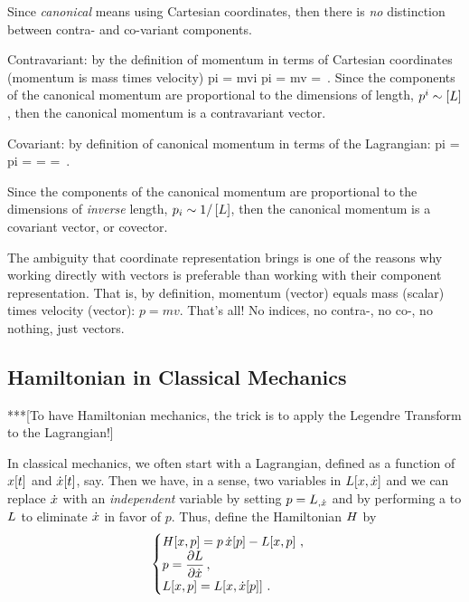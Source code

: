 \begin{solution}
Since \emph{canonical} means using Cartesian coordinates, then there is \emph{no} distinction between contra- and co-variant components.

Contravariant: by the definition of momentum in terms of Cartesian coordinates (momentum is mass times velocity)
\beq
\cnvec pi = m\cnvec vi \implies \dim \cnvec pi = \dim mv = \,.
\eeq
Since the components of the canonical momentum are proportional to the dimensions of length, ${p}^{i}\sim \left[{L}\right]$, then the canonical momentum is a contravariant vector.

Covariant: by definition of canonical momentum in terms of the Lagrangian:
\beq
\covec pi = \xpd{}\implies \dim\covec pi 
          = \dim \xpd{} 
          = 
          = \,.
\eeq

Since the components of the canonical momentum are proportional to the dimensions of \emph{inverse} length, ${p}_{i}\sim 1/\left[{L}\right]$, then the canonical momentum is a covariant vector, or covector.
\end{solution}

\begin{note}
The ambiguity that coordinate representation brings is one of the reasons why working directly with vectors is preferable than working with their component representation. That is, by definition, momentum (vector) equals mass (scalar) times velocity (vector): $p = mv$. That's all! No indices, no contra-, no co-, no nothing, just vectors.
\end{note}


\subsection{Hamiltonian in Classical Mechanics}

***[To have Hamiltonian mechanics, the trick is to apply the Legendre Transform to the Lagrangian!]

In classical mechanics, we often start with a Lagrangian, defined as a function of $x\!\left[{t}\right]$ and $\dot{x}\!\left[{t}\right]$, say. Then we have, in a sense, two variables in $L\!\left[{x,\dot{x}}\right]$ and we can replace $\dot{x}$ with an \emph{independent} variable by setting $p = {L}_{,{\dot{x}}}$ and by performing a  to $L$ to eliminate $\dot{x}$ in favor of $p$. Thus, define the Hamiltonian $H$ by
\begin{equation}\label{eq:definitionhamiltonian}
  \begin{cases}
    H\!\left[{x, p}\right] = p\,\dot{x}\!\left[{p}\right] - L\!\left[{x, p}\right]\,,\\
                     p = \dfrac{\partial{L}}{\partial{\dot{x}}}\,,\\
    L\!\left[{x, p}\right] = L\!\left[{x, \dot{x}\!\left[{p}\right]}\right]\,.
  \end{cases}
\end{equation}

